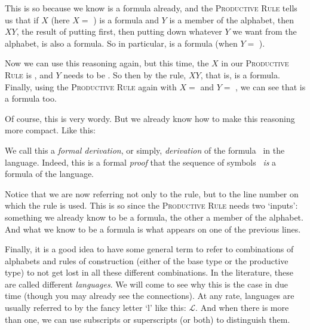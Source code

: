 This is so because we know \bbox{} is a formula already, and the \textsc{Productive Rule} tells us that if $X$ (here $X=$ \bbox) is a formula and $Y$ is a member of the alphabet, then $XY$, the result of putting \bbox{} first, then putting down whatever $Y$ we want from the alphabet, is also a formula. So in particular, \bbox\bcirc{} is a formula (when $Y=$ \bcirc).

Now we can use this reasoning again, but this time, the $X$ in our \textsc{Productive Rule} is \bbox\bcirc, and $Y$ needs to be \bbox. So then by the rule, $XY$, that is, \bbox\bcirc\bbox{} is a formula. Finally, using the \textsc{Productive Rule} again with $X=$ \bbox\bcirc\bbox{} and $Y=$ \btri{}, we can see that \bbox\bcirc\bbox\btri{} is a formula too. 

Of course, this is very wordy. But we already know how to make this reasoning more compact. Like this: 

\medskip
\begin{axiomatic}
\end{axiomatic}

\begin{remark}
We call this a \textit{formal derivation}, or simply, \textit{derivation} of the formula \bbox\bcirc\bbox\btri\ in the language. Indeed, this is a formal \textit{proof} that the sequence of symbols \bbox\bcirc\bbox\btri\ \textit{is} a formula of the language. 
\end{remark}

Notice that we are now referring not only to the rule, but to the line number on which the rule is used. This is so since the \textsc{Productive Rule} needs two `inputs': something we already know to be a formula, the other a member of the alphabet. And what we know to be a formula is what appears on one of the previous lines. 

Finally, it is a good idea to have some general term to refer to combinations of alphabets and rules of construction (either of the base type or the productive type) to not get lost in all these different combinations. In the literature, these are called different \textit{languages}. We will come to see why this is the case in due time (though you may already see the connections). At any rate, languages are usually referred to by the fancy letter `l' like this: $\mathcal{L}$. And when there is more than one, we can use subscripts or superscripts (or both) to distinguish them. 

